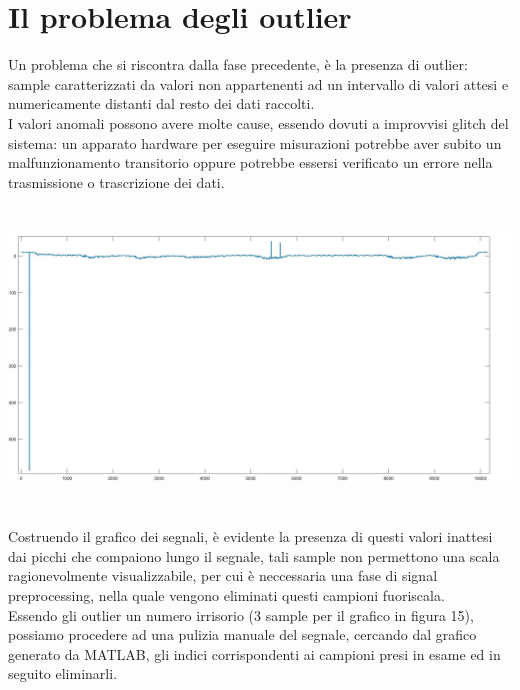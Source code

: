 \documentclass[a4paper, oneside]{book}
\begin{document}
\section{Il problema degli outlier}
Un problema che si riscontra dalla fase precedente, è la presenza di outlier: sample caratterizzati da valori non appartenenti ad un intervallo di valori attesi e numericamente distanti dal resto dei dati raccolti.  \\
I valori anomali possono avere molte cause, essendo dovuti a improvvisi glitch del sistema: un apparato hardware per eseguire misurazioni potrebbe aver subito un malfunzionamento transitorio oppure potrebbe essersi verificato un errore nella trasmissione o trascrizione dei dati. \\
\begin{minipage}{\linewidth}
\begin{center}
\vspace{7mm}
\includegraphics[width=154mm, height= 80mm]{./images/registrazione_tesi/outliers.jpg} 
\vspace{7mm}
\end{center}
\end{minipage}
\makebox[\linewidth]{}
Costruendo il grafico dei segnali, è evidente la presenza di questi valori inattesi dai picchi che compaiono lungo il segnale, tali sample non permettono una scala ragionevolmente visualizzabile, per cui è neccessaria una fase di signal preprocessing, nella quale vengono eliminati questi campioni fuoriscala. \\
Essendo gli outlier un numero irrisorio (3 sample per il grafico in figura 15), possiamo procedere ad una pulizia manuale del segnale, cercando dal grafico generato da MATLAB, gli indici corrispondenti ai campioni presi in esame ed in seguito eliminarli.
\end{document}
